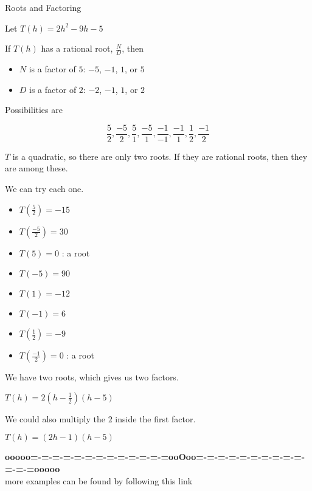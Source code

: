 \documentclass{ximera}
\begin{document}
\begin{example}  Roots and Factoring


Let $T(h) = 2 h^2 - 9h - 5$



If $T(h)$ has a rational root, $\frac{N}{D}$, then


\begin{itemize}
\item $N$ is a factor of $5$: $-5$, $-1$, $1$, or $5$
\item $D$ is a factor of $2$: $-2$, $-1$, $1$, or $2$
\end{itemize}



Possibilities are 

\[  \frac{5}{2}, \frac{-5}{2}, \frac{5}{1}, \frac{-5}{1}, \frac{-1}{-1}, \frac{-1}{1}, \frac{1}{2}, \frac{-1}{2}   \]


$T$ is a quadratic, so there are only two roots. If they are rational roots, then they are among these.


We can try each one.



\begin{itemize}
\item $T\left( \frac{5}{2} \right) = -15$
\item $T\left( \frac{-5}{2} \right) = 30$
\item $T(5) = 0$   : a root
\item $T(-5) = 90$
\item $T(1) = -12$   
\item $T(-1) = 6$
\item $T\left( \frac{1}{2} \right) = -9$
\item $T\left( \frac{-1}{2} \right) = 0$ : a root
\end{itemize}

We have two roots, which gives us two factors.


$T(h) = 2\left(h-\frac{1}{2} \right)(h-5)$

We could also multiply the $2$ inside the first factor.


$T(h) = (2h - 1)(h-5)$



\end{example}










\begin{center}
\textbf{\textcolor{green!50!black}{ooooo=-=-=-=-=-=-=-=-=-=-=-=-=ooOoo=-=-=-=-=-=-=-=-=-=-=-=-=ooooo}} \\

more examples can be found by following this link\\ 

\end{center}
\end{document}
